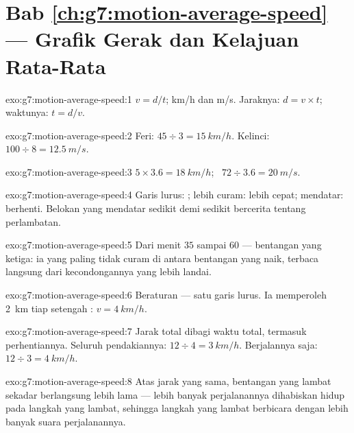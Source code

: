 \section*{Bab \ref{ch:g7:motion-average-speed} --- Grafik Gerak dan Kelajuan Rata-Rata}

\begin{solution}{exo:g7:motion-average-speed:1}
$v = d/t$;  \unit{km/h} dan \unit{m/s}. Jaraknya:
$d = v \times t$; waktunya: $t = d/v$.
\end{solution}

\begin{solution}{exo:g7:motion-average-speed:2}
Feri: $45 \div 3 = \qty{15}{km/h}$. Kelinci: $100 \div 8 =
\qty{12.5}{m/s}$.
\end{solution}

\begin{solution}{exo:g7:motion-average-speed:3}
$5 \times 3.6 = \qty{18}{km/h}$; \ $72 \div 3.6 = \qty{20}{m/s}$.
\end{solution}

\begin{solution}{exo:g7:motion-average-speed:4}
Garis lurus: ; lebih curam: lebih cepat; mendatar:
berhenti. Belokan yang mendatar sedikit demi sedikit bercerita tentang
perlambatan.
\end{solution}

\begin{solution}{exo:g7:motion-average-speed:5}
Dari menit $35$ sampai $60$ --- bentangan yang ketiga: ia yang paling
tidak curam di antara bentangan yang naik, terbaca langsung dari
kecondongannya yang lebih landai.
\end{solution}

\begin{solution}{exo:g7:motion-average-speed:6}
Beraturan --- satu garis lurus. Ia memperoleh \qty{2}{km} tiap
setengah : $v = \qty{4}{km/h}$.
\end{solution}

\begin{solution}{exo:g7:motion-average-speed:7}
Jarak total dibagi waktu total, termasuk perhentiannya. Seluruh
pendakiannya: $12 \div 4 = \qty{3}{km/h}$. Berjalannya saja: $12 \div 3 =
\qty{4}{km/h}$.
\end{solution}

\begin{solution}{exo:g7:motion-average-speed:8}
Atas jarak yang sama, bentangan yang lambat sekadar berlangsung lebih
lama --- lebih banyak  perjalanannya dihabiskan hidup pada langkah
yang lambat, sehingga langkah yang lambat berbicara dengan lebih
banyak suara perjalanannya.
\end{solution}


